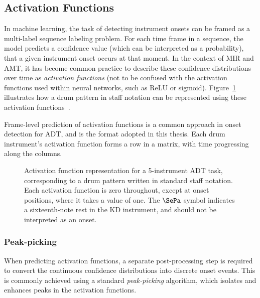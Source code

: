 \subsection{Activation Functions}

In machine learning, the task of detecting instrument onsets can be framed as a multi-label sequence labeling problem. For each time frame in a sequence, the model predicts a confidence value (which can be interpreted as a probability), that a given instrument onset occurs at that moment. In the context of \gls{MIR} and \gls{AMT}, it has become common practice to describe these confidence distributions over time as \textit{activation functions} (not to be confused with the activation functions used within neural networks, such as \acrshort{ReLU} or sigmoid). Figure~\ref{ActivationsFigure} illustrates how a drum pattern in staff notation can be represented using these activation functions~\cite{schluter2014improved, bock2016joint, Southall2016AutomaticDT, 8350302, vogl2018multiinstrumentdrumtranscription}.

Frame-level prediction of activation functions is a common approach in onset detection for \gls{ADT}, and is the format adopted in this thesis. Each drum instrument's activation function forms a row in a matrix, with time progressing along the columns.

\begin{figure}[H]
    \centering
    \hspace*{-0.5cm}
    
    \caption{Activation function representation for a 5-instrument \gls{ADT} task, corresponding to a drum pattern written in standard staff notation. Each activation function is zero throughout, except at onset positions, where it takes a value of one. The $\SePa$ symbol indicates a sixteenth-note rest in the \gls{KD} instrument, and should not be interpreted as an onset.}
    \label{ActivationsFigure}
\end{figure}

\subsubsection{Peak-picking}

When predicting activation functions, a separate post-processing step is required to convert the continuous confidence distributions into discrete onset events. This is commonly achieved using a standard \textit{peak-picking} algorithm, which isolates and enhances peaks in the activation functions.

